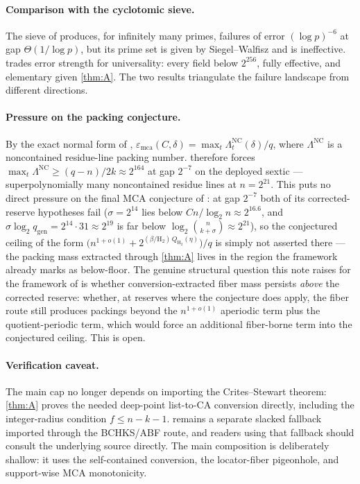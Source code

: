 \documentclass[11pt]{article}
\theoremstyle{definition}
\theoremstyle{remark}
\newcommand{\emca}{\varepsilon_{\mathrm{mca}}}
\newcommand{\Hb}{\mathrm{H}_2}
\begin{document}
\paragraph{Comparison with the cyclotomic sieve.}
The sieve of \cite{Cho26a} produces, for infinitely many primes, failures of error $(\log p)^{-6}$ at gap $\Theta(1/\log p)$, but its prime set is given by Siegel--Walfisz and is ineffective.  trades error strength for universality: every field below $2^{256}$, fully effective, and elementary given \cref{thm:A}. The two results triangulate the failure landscape from different directions.

\paragraph{Pressure on the packing conjecture.}
By the exact normal form of \cite{Cho26b}, $\emca(C,\delta)=\max_t\Lambda^{\mathrm{NC}}_t(\delta)/q$, where $\Lambda^{\mathrm{NC}}$ is a noncontained residue-line packing number.  therefore forces $\max_t\Lambda^{\mathrm{NC}}\ge(q-n)/2k\approx2^{164}$ at gap $2^{-7}$ on the deployed sextic --- superpolynomially many noncontained residue lines at $n=2^{21}$. This puts no direct pressure on the final MCA conjecture of \cite[Conj.\ ``Final floor- and quotient-corrected MCA asymptotic'']{Cho26b}: at gap $2^{-7}$ both of its corrected-reserve hypotheses fail ($\sigma=2^{14}$ lies below $Cn/\log_2n\approx2^{16.6}$, and $\sigma\log_2 q_{\mathrm{gen}}=2^{14}\cdot31\approx2^{19}$ is far below $\log_2\binom n{k+\sigma}\approx2^{21}$), so the conjectured ceiling of the form $\bigl(n^{1+o(1)}+2^{(\beta/\Hb)\,Q_{\Hb}(\eta)}\bigr)/q$ is simply not asserted there --- the packing mass extracted through \cref{thm:A} lives in the region the framework already marks as below-floor. The genuine structural question this note raises for the framework of \cite{Cho26b} is whether conversion-extracted fiber mass persists \emph{above} the corrected reserve: whether, at reserves where the conjecture does apply, the fiber route still produces packings beyond the $n^{1+o(1)}$ aperiodic term plus the quotient-periodic term, which would force an additional fiber-borne term into the conjectured ceiling. This is open.

\paragraph{Verification caveat.}
The main cap no longer depends on importing the Crites--Stewart theorem: \cref{thm:A} proves the needed deep-point list-to-CA conversion directly, including the integer-radius condition $f\le n-k-1$.   remains a separate slacked fallback imported through the BCHKS/ABF route, and readers using that fallback should consult the underlying source directly.  The main composition is deliberately shallow: it uses the self-contained conversion, the locator-fiber pigeonhole, and support-wise MCA monotonicity.
\end{document}
